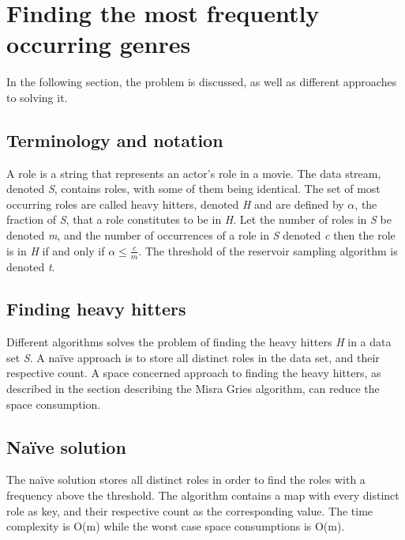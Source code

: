 \section{Finding the most frequently occurring genres}
In the following section, the problem is discussed, as well as different approaches to solving it.

\subsection{Terminology and notation}
A role is a string that represents an actor’s role in a movie. The data stream, denoted \textit{S}, contains roles, with some of them being identical. The set of most occurring roles are called heavy hitters, denoted \textit{H} and are defined by \(\alpha\), the fraction of \textit{S}, that a role constitutes to be in \textit{H}.
Let the number of roles in \textit{S} be denoted \textit{m}, and the number of occurrences of a role in \textit{S} denoted \textit{c} then the role is in \textit{H} if and only if 
\begin{math}
	\alpha \le \frac{c}{m}
\end{math}. The threshold of the reservoir sampling algorithm is denoted \textit{t}.

\subsection{Finding heavy hitters}
Different algorithms solves the problem of finding the heavy hitters \textit{H} in a data set \textit{S}. A naïve approach is to store all distinct roles in the data set, and their respective count. A space concerned approach to finding the heavy hitters, as described in the section describing the Misra Gries algorithm, can reduce the space consumption.

\subsection{Naïve solution}
The naïve solution stores all distinct roles in order to find the roles with a frequency above the threshold. The algorithm contains a map with every distinct role as key, and their respective count as the corresponding value. The time complexity is O(m) while the worst case space consumptions is O(m).

